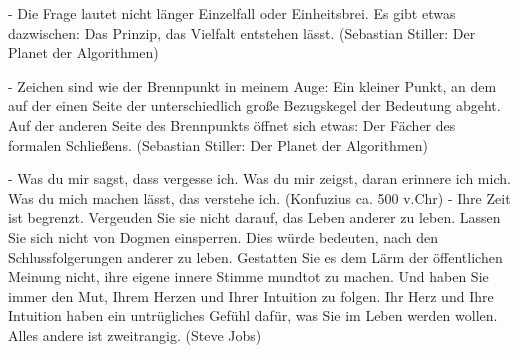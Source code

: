 -   Die Frage lautet nicht länger Einzelfall oder Einheitsbrei. Es gibt etwas dazwischen:
    Das Prinzip, das Vielfalt entstehen lässt. (Sebastian Stiller: Der Planet der Algorithmen)

-   Zeichen sind wie der Brennpunkt in meinem Auge: Ein kleiner Punkt, an dem auf der einen 
    Seite der unterschiedlich große Bezugskegel der Bedeutung abgeht. Auf der anderen Seite des Brennpunkts
    öffnet sich etwas: Der Fächer des formalen Schließens. (Sebastian Stiller: Der Planet der Algorithmen)

-   Was du mir sagst, dass vergesse ich.
    Was du mir zeigst, daran erinnere ich mich.
    Was du mich machen lässt, das verstehe ich.
    (Konfuzius ca. 500 v.Chr)
-   Ihre Zeit ist begrenzt. Vergeuden Sie sie nicht darauf, das Leben anderer zu leben. Lassen Sie sich nicht von Dogmen einsperren. Dies würde bedeuten, nach den Schlussfolgerungen anderer zu leben. Gestatten Sie es dem Lärm der öffentlichen Meinung nicht, ihre eigene innere Stimme mundtot zu machen. Und haben Sie immer den Mut, Ihrem Herzen und Ihrer Intuition zu folgen. Ihr Herz und Ihre Intuition haben ein untrügliches Gefühl dafür, was Sie im Leben werden wollen. Alles andere ist zweitrangig.
    (Steve Jobs)    
